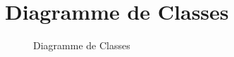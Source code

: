 \chapter{Diagramme de Classes}

\begin{figure}
    \caption{Diagramme de Classes}
    \centering
\end{figure} 